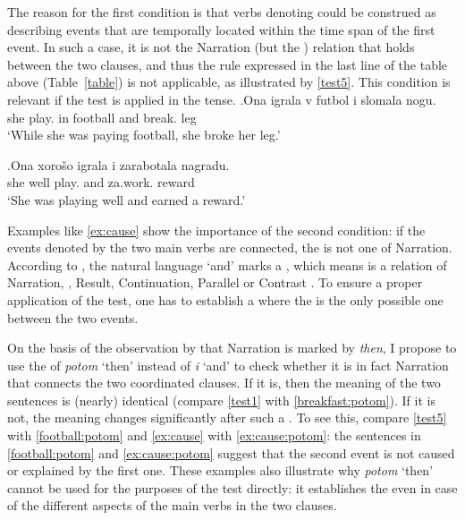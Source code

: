 The reason for the first condition is that verbs denoting  could be construed as describing events that are temporally located within the time span of the first event. In such a case, it is not the Narration (but the ) relation that holds between the two clauses, and thus the rule expressed in the last line of the table above (Table~\ref{table}) is not applicable, as illustrated by \ref{test5}. This condition is relevant if the test is applied in the  tense.
\exg.\label{test5}Ona igrala\textsuperscript{\IPF} v futbol i slomala\textsuperscript{\PF} nogu.\\
she play. in football and break. leg\\
\trans `While she was paying football, she broke her leg.'

\exg.\label{ex:cause}Ona xoro\v{s}o igrala\textsuperscript{\IPF} i zarabotala\textsuperscript{\PF} nagradu.\\
she well play. and za.work. reward\\
\trans `She was playing well and earned a reward.'

Examples like \ref{ex:cause} show the importance of the second condition: if the events denoted by the two main verbs are connected, the  is not one of Narration. According to \citet{Txurruka:03}, the natural language  `and' marks a , which means is a relation of Narration, , Result, Continuation, Parallel or Contrast \citep{Asher:05}. To ensure a proper application of the test, one has to establish a  where the  is the only possible one between the two events. 

On the basis of the observation by \citet{Txurruka:03} that Narration is marked by \textit{then}, I propose to use the  of \textit{potom} `then' instead of \textit{i} `and' to check whether it is in fact Narration that connects the two coordinated clauses. If it is, then the meaning of the two sentences is (nearly) identical (compare \ref{test1} with \ref{breakfast:potom}). If it is not, the meaning changes significantly after such a . To see this, compare \ref{test5} with \ref{football:potom} and \ref{ex:cause} with \ref{ex:cause:potom}: the sentences in \ref{football:potom} and \ref{ex:cause:potom} suggest that the second event is not caused or explained by the first one. These examples also illustrate why \textit{potom} `then' cannot be used for the purposes of the test directly: it establishes the  even in case of the different aspects of the main verbs in the two clauses.

